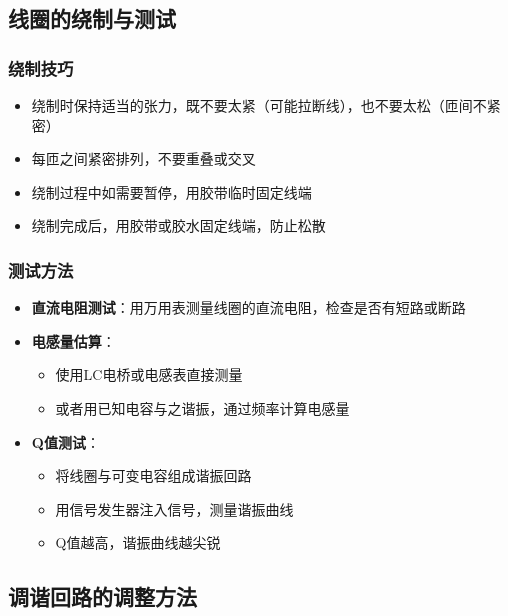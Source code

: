 \documentclass[12pt,UTF8]{ctexbook}
\begin{document}
\subsection{线圈的绕制与测试}

\subsubsection{绕制技巧}

\begin{itemize}[leftmargin=3.5em]
    \item 绕制时保持适当的张力，既不要太紧（可能拉断线），也不要太松（匝间不紧密）
    \item 每匝之间紧密排列，不要重叠或交叉
    \item 绕制过程中如需要暂停，用胶带临时固定线端
    \item 绕制完成后，用胶带或胶水固定线端，防止松散
\end{itemize}

\subsubsection{测试方法}

\begin{itemize}[leftmargin=3.5em]
    \item \textbf{直流电阻测试}：用万用表测量线圈的直流电阻，检查是否有短路或断路
    \item \textbf{电感量估算}：
        \begin{itemize}[leftmargin=3.5em]
            \item 使用LC电桥或电感表直接测量
            \item 或者用已知电容与之谐振，通过频率计算电感量
        \end{itemize}
    \item \textbf{Q值测试}：
        \begin{itemize}[leftmargin=3.5em]
            \item 将线圈与可变电容组成谐振回路
            \item 用信号发生器注入信号，测量谐振曲线
            \item Q值越高，谐振曲线越尖锐
        \end{itemize}
\end{itemize}

\subsection{调谐回路的调整方法}
\end{document}
